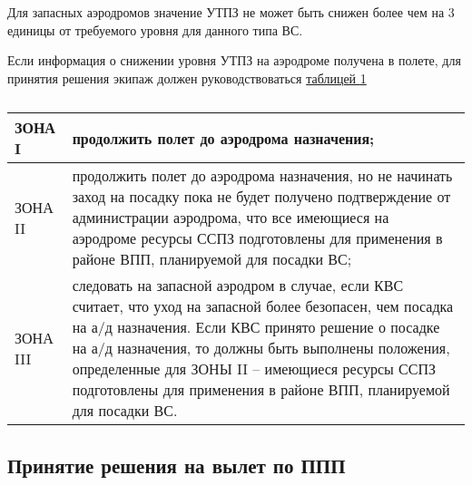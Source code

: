 Для запасных аэродромов значение УТПЗ не может быть снижен более чем на 3 единицы от требуемого уровня для данного типа ВС. 

Если информация о снижении уровня УТПЗ на аэродроме получена в полете, для принятия решения экипаж должен руководствоваться \hyperref[tbl:04T6]{таблицей \ref*{tbl:04T6}} 

 
\begin{table}[H]
    \begin{center}
    \caption{} \label{tbl:04T6}
    \small
    \begin{tabular}{|p{}|p{}|}
    \hline
    ЗОНА I  &продолжить полет до аэродрома назначения;\\\hline
    ЗОНА II &продолжить полет до аэродрома назначения, но не начинать заход на посадку пока не будет получено подтверждение от администрации аэродрома, что все имеющиеся на аэродроме ресурсы ССПЗ подготовлены для применения в районе ВПП, планируемой для посадки ВС;\\\hline
    ЗОНА III&следовать на запасной аэродром в случае, если КВС считает, что уход на запасной более безопасен, чем посадка на а/д назначения. Если КВС принято решение о посадке на а/д назначения, то должны быть выполнены положения, определенные для ЗОНЫ II – имеющиеся ресурсы ССПЗ подготовлены для применения в районе ВПП, планируемой для посадки ВС.\\
    \hline\hline
    \end{tabular}
    \end{center}
\end{table}

	

\subsection{Принятие решения на вылет по ППП}

